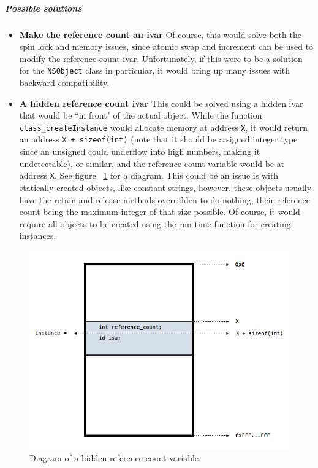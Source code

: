\subparagraph{Possible solutions}
\begin{itemize}
  \item{\bf{Make the reference count an ivar}} Of course, this would solve both the spin lock and memory issues, since atomic swap and increment can be used to modify the reference count ivar. Unfortunately, if this were to be a solution for the \verb=NSObject= class in particular, it would bring up many issues with backward compatibility.
  \item{\bf{A hidden reference count ivar}} This could be solved using a hidden ivar that would be ``in front" of the actual object. While the function \verb=class_createInstance= would allocate memory at address \verb=X=, it would return an address \verb=X + sizeof(int)= (note that it should be a signed integer type since an unsigned could underflow into high numbers, making it undetectable), or similar, and the reference count variable would be at address \verb=X=. See figure ~\ref{fig:ref_cnt_hidden_ivar} for a diagram. This could be an issue is with statically created objects, like constant strings, however, these objects usually have the retain and release methods overridden to do nothing, their reference count being the maximum integer of that size possible. Of course, it would require all objects to be created using the run-time function for creating instances.
\end{itemize}

\begin{figure}[H]
  \includegraphics[width=\textwidth]{img/hidden_ref_cnt_var.png}
  
  \centering{}
  \caption{Diagram of a hidden reference count variable.}
  \label{fig:ref_cnt_hidden_ivar}
\end{figure}

